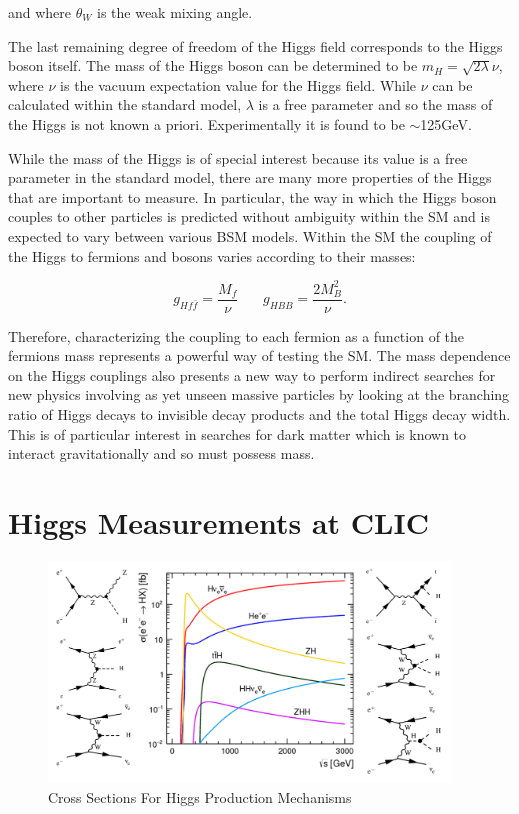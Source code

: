 and where $\theta_{W}$ is the weak mixing angle.

The last remaining degree of freedom of the Higgs field corresponds to the Higgs boson itself. The mass of the Higgs boson can be determined to be $m_{H}=\sqrt{2\lambda}\nu$, where $\nu$ is the vacuum expectation value for the Higgs field. While $\nu$ can be calculated within the standard model, $\lambda$ is a free parameter and so the mass of the Higgs is not known a priori. Experimentally it is found to be $\sim$125GeV\cite{:2012gk,Chatrchyan:2012xdj}.

While the mass of the Higgs is of special interest because its value is a free parameter in the standard model, there are many more properties of the Higgs that are important to measure. In particular, the way in which the Higgs boson couples to other particles is predicted without ambiguity within the \ac{SM} and is expected to vary between various \ac{BSM} models. Within the \ac{SM} the coupling of the Higgs to fermions and bosons varies according to their masses:


\begin{equation}
g_{Hf\bar{f}}=\frac{M_f}{\nu} ~~~~~~~~    g_{HBB}=\frac{2M_B^2}{\nu} .
\end{equation}

Therefore, characterizing the coupling to each fermion as a function of the fermions mass represents a powerful way of testing the \ac{SM}. The mass dependence on the Higgs couplings also presents a new way to perform indirect searches for new physics involving as yet unseen massive particles by looking at the branching ratio of Higgs decays to invisible decay products and the total Higgs decay width. This is of particular interest in searches for dark matter which is known to interact gravitationally and so must possess mass. 

\section{Higgs Measurements at CLIC}
\begin{figure}
  \centering
  \includegraphics[width=0.95\textwidth,keepaspectratio]{Theory/fig/HiggsProcessesExtra.png}
  \caption[Cross Sections For Higgs Production Mechanisms]{Cross Sections For Higgs Production Mechanisms \cite{Abramowicz:2016zbo}}
  \label{fig:higgsXSecs}
\end{figure}


